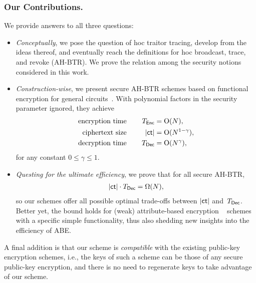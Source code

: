 \subsubsection{Our Contributions.}
We provide answers to all three questions:
\begin{itemize}
\item \emph{Conceptually}, we pose the question of \ad hoc traitor tracing,
develop from the ideas thereof, and
eventually reach the definitions for \ad hoc broadcast, trace, and revoke (AH-BTR).
We prove the relation among the security notions considered in this work.
\item \emph{Construction-wise},
we present secure AH-BTR schemes based on functional encryption for general circuits~\cite{TCC:BonSahWat11}.
With polynomial factors in the security parameter ignored,
they achieve
\begin{align*}
\textup{encryption time}\qquad\qquad\mathllap{T_\Enc}&{}=\bigO(N),\\
\textup{ciphertext size}\qquad\qquad\mathllap{|\ct|}&{}=\bigO(N^{1-\gamma}),\\
\textup{decryption time}\qquad\qquad\mathllap{T_\Dec}&{}=\bigO(N^\gamma),
\end{align*}
for any constant ${0\leq\gamma\leq 1}$.
\item \emph{Questing for the ultimate efficiency},
we prove that for all secure AH-BTR,
\begin{align*}
|\ct|\cdot\TDec=\bigOmega(N),
\end{align*}
so our schemes offer all possible optimal trade-offs between $|\ct|$ and~$\TDec$.
Better yet, the bound holds for (weak) attribute-based encryption%
~\cite{EC:SahWat05,CCS:GPSW06} schemes with a specific simple functionality, thus also shedding new insights into the efficiency of ABE.
\end{itemize}
A final addition is that our scheme is \emph{compatible} with the existing public-key encryption schemes,
i.e., the keys of such a scheme can be those of any secure public-key encryption, and
there is no need to regenerate keys to take advantage of our scheme.
